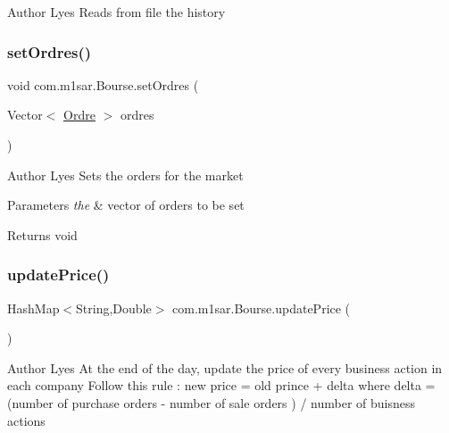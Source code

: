 \begin{DoxyAuthor}{Author}
Lyes Reads from file the history 
\end{DoxyAuthor}
\mbox{\label{classcom_1_1m1sar_1_1_bourse_a33e6699fa91c63f54221f1ebf3de723b}} 
\subsubsection{\texorpdfstring{set\+Ordres()}{setOrdres()}}
{\footnotesize\ttfamily void com.\+m1sar.\+Bourse.\+set\+Ordres (\begin{DoxyParamCaption}\item[{Vector$<$ \hyperlink{classcom_1_1m1sar_1_1_ordre}{Ordre} $>$}]{ordres }\end{DoxyParamCaption})}

\begin{DoxyAuthor}{Author}
Lyes Sets the orders for the market 
\end{DoxyAuthor}

\begin{DoxyParams}{Parameters}
{\em the} & vector of orders to be set \\
\hline
\end{DoxyParams}
\begin{DoxyReturn}{Returns}
{\ttfamily void} 
\end{DoxyReturn}
\mbox{\label{classcom_1_1m1sar_1_1_bourse_a36588334a5398fdd07745a39ac809fa0}} 
\subsubsection{\texorpdfstring{update\+Price()}{updatePrice()}}
{\footnotesize\ttfamily Hash\+Map$<$String,Double$>$ com.\+m1sar.\+Bourse.\+update\+Price (\begin{DoxyParamCaption}{ }\end{DoxyParamCaption})}

\begin{DoxyAuthor}{Author}
Lyes At the end of the day, update the price of every business action in each company Follow this rule \+: new price = old prince + delta where delta = (number of purchase orders -\/ number of sale orders ) / number of buisness actions 
\end{DoxyAuthor}
\mbox{\label{classcom_1_1m1sar_1_1_bourse_a04a69e51bbab147243a5b9f37fcc561a}} 
